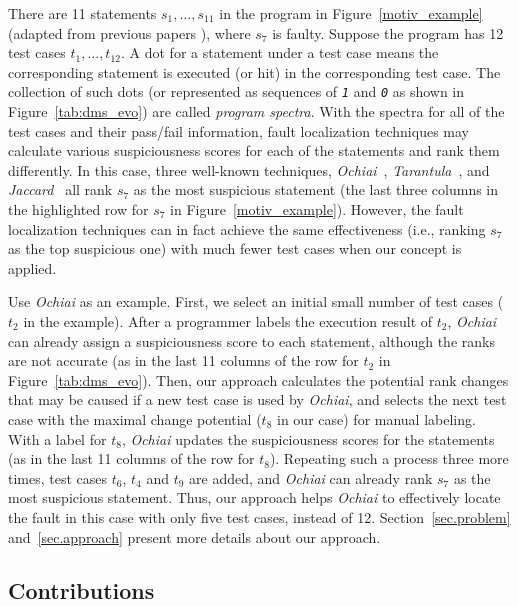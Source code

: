 There are 11 statements $s_{1},...,s_{11}$ in the program in Figure~\ref{motiv_example} (adapted from previous papers \citep{Gonzalez-SanchezPAGG11,JiangCT11}), where $s_{7}$ is faulty. Suppose the program has 12 test cases $t_{1},...,t_{12}$. A dot for a statement under a test case means the corresponding statement is executed (or hit) in the corresponding test case. The collection of such dots (or represented as sequences of \texttt{\textit{1}} and \texttt{\textit{0}} as shown in Figure~\ref{tab:dms_evo}) are called {\em program spectra}. With the spectra for all of the test cases and their pass/fail information, fault localization techniques may calculate various suspiciousness scores for each of the statements and rank them differently. In this case, three well-known techniques, {\em Ochiai}~\citep{Abreu:2009.jss}, {\em Tarantula}~\citep{JH05}, and {\em Jaccard}~\citep{Abreu:2009.jss} all rank $s_{7}$ as the most suspicious statement (the last three columns in the highlighted row for $s_{7}$ in Figure~\ref{motiv_example}). However, the fault localization techniques can in fact achieve the same effectiveness (i.e., ranking $s_{7}$ as the top suspicious one) with much fewer test cases when our concept is applied.

Use {\em Ochiai} as an example. First, we select an initial small number of test cases ($t_{2}$ in the example). After a programmer labels the execution result of $t_{2}$, {\em Ochiai} can already assign a suspiciousness score to each statement, although the ranks are not accurate (as in the last 11 columns of the row for $t_{2}$ in Figure~\ref{tab:dms_evo}). Then, our approach calculates the potential rank changes that may be caused if a new test case is used by {\em Ochiai}, and selects the next test case with the maximal change potential ($t_{8}$ in our case) for manual labeling. With a label for $t_{8}$, {\em Ochiai} updates the suspiciousness scores for the statements (as in the last 11 columns of the row for $t_{8}$). Repeating such a process three more times, test cases $t_{6}$, $t_{4}$ and $t_{9}$ are added, and {\em Ochiai} can already rank $s_{7}$ as the most suspicious statement. Thus, our approach helps {\em Ochiai} to effectively locate the fault in this case with only five test cases, instead of 12. Section~\ref{sec.problem} and~\ref{sec.approach} present more details about our approach.

\subsection{Contributions}

